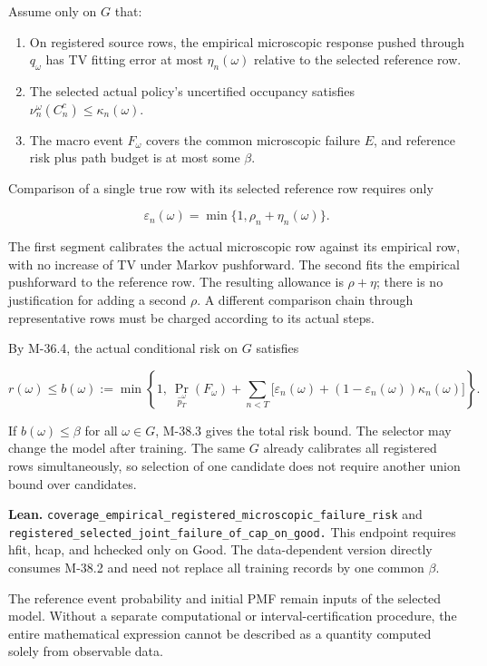 \documentclass[
  english,
  11pt,
  oneside]{book}
\providecommand{\tightlist}{%
  \setlength{\itemsep}{0pt}\setlength{\parskip}{0pt}}
\begin{document}
Assume only on \(G\) that:

\begin{enumerate}
\def\labelenumi{\arabic{enumi}.}
\tightlist
\item
  On registered source rows, the empirical microscopic response pushed through \(q_\omega\) has TV fitting error at most \(\eta_n(\omega)\) relative to the selected reference row.
\item
  The selected actual policy's uncertified occupancy satisfies \(\nu_n^\omega(C_n^c)\le\kappa_n(\omega)\).
\item
  The macro event \(F_\omega\) covers the common microscopic failure \(E\), and reference risk plus path budget is at most some \(\beta\).
\end{enumerate}

Comparison of a single true row with its selected reference row requires only

\[\varepsilon_n(\omega)=\min\{1,\rho_n+\eta_n(\omega)\}.\]

The first segment calibrates the actual microscopic row against its empirical row, with no increase of TV under Markov pushforward. The second fits the empirical pushforward to the reference row. The resulting allowance is \(\rho+\eta\); there is no justification for adding a second \(\rho\). A different comparison chain through representative rows must be charged according to its actual steps.

By M-36.4, the actual conditional risk on \(G\) satisfies

\[r(\omega)\le b(\omega):=
\min\left\{1,\
\Pr_{\widehat p_T^\omega}(F_\omega)+
\sum_{n<T}\bigl[
\varepsilon_n(\omega)+
(1-\varepsilon_n(\omega))\kappa_n(\omega)
\bigr]\right\}.\]

If \(b(\omega)\le\beta\) for all \(\omega\in G\), M-38.3 gives the total risk bound. The selector may change the model after training. The same \(G\) already calibrates all registered rows simultaneously, so selection of one candidate does not require another union bound over candidates.

\textbf{Lean.} \nolinkurl{coverage_empirical_registered_microscopic_failure_risk} and \nolinkurl{registered_selected_joint_failure_of_cap_on_good.} This endpoint requires hfit, hcap, and hchecked only on Good. The data-dependent version directly consumes M-38.2 and need not replace all training records by one common \(\beta\).

The reference event probability and initial PMF remain inputs of the selected model. Without a separate computational or interval-certification procedure, the entire mathematical expression cannot be described as a quantity computed solely from observable data.
\end{document}
